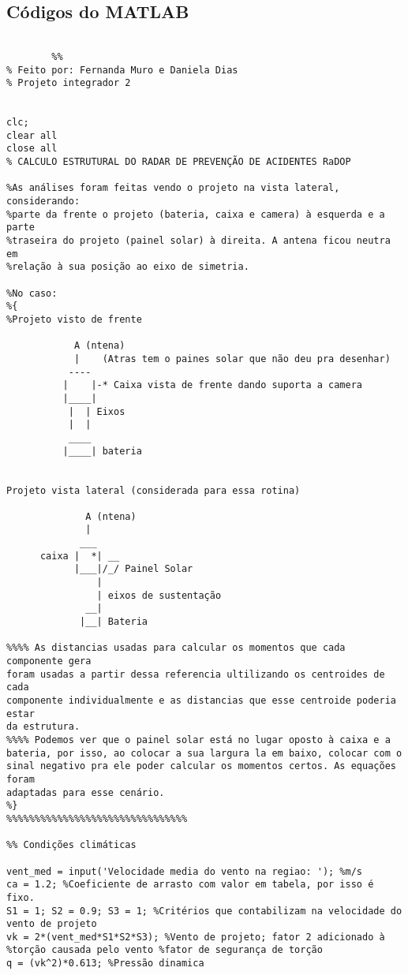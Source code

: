 \begin{anexosenv}

\partanexos

\chapter{Códigos do MATLAB}
    \begin{lstlisting}
            
        %%
% Feito por: Fernanda Muro e Daniela Dias
% Projeto integrador 2


clc;
clear all
close all
% CALCULO ESTRUTURAL DO RADAR DE PREVENÇÃO DE ACIDENTES RaDOP

%As análises foram feitas vendo o projeto na vista lateral, considerando:
%parte da frente o projeto (bateria, caixa e camera) à esquerda e a parte 
%traseira do projeto (painel solar) à direita. A antena ficou neutra em
%relação à sua posição ao eixo de simetria.

%No caso:
%{
%Projeto visto de frente

            A (ntena)           
            |    (Atras tem o paines solar que não deu pra desenhar)
           ----    
          |    |-* Caixa vista de frente dando suporta a camera
          |____|
           |  | Eixos
           |  |
           ____
          |____| bateria


Projeto vista lateral (considerada para essa rotina)

              A (ntena)
              |
             ___    
      caixa |  *| __
            |___|/_/ Painel Solar
                |
                | eixos de sustentação
              __|
             |__| Bateria

%%%% As distancias usadas para calcular os momentos que cada componente gera
foram usadas a partir dessa referencia ultilizando os centroides de cada
componente individualmente e as distancias que esse centroide poderia estar
da estrutura.
%%%% Podemos ver que o painel solar está no lugar oposto à caixa e a
bateria, por isso, ao colocar a sua largura la em baixo, colocar com o
sinal negativo pra ele poder calcular os momentos certos. As equações foram
adaptadas para esse cenário.
%}
%%%%%%%%%%%%%%%%%%%%%%%%%%%%%%%%

%% Condições climáticas

vent_med = input('Velocidade media do vento na regiao: '); %m/s
ca = 1.2; %Coeficiente de arrasto com valor em tabela, por isso é fixo.
S1 = 1; S2 = 0.9; S3 = 1; %Critérios que contabilizam na velocidade do vento de projeto
vk = 2*(vent_med*S1*S2*S3); %Vento de projeto; fator 2 adicionado à 
%torção causada pelo vento %fator de segurança de torção
q = (vk^2)*0.613; %Pressão dinamica


\end{lstlisting}
\end{anexosenv}
